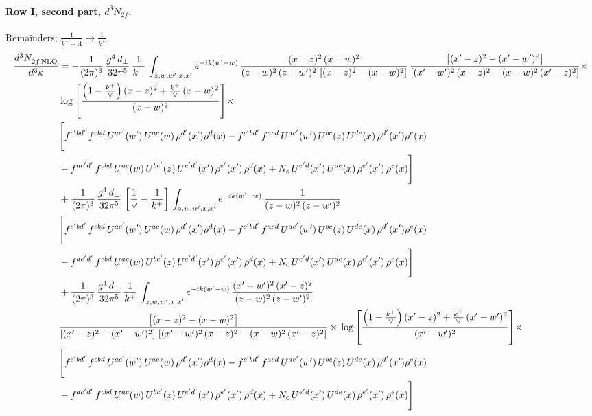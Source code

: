 \documentclass[10pt]{article}
\numberwithin{equation}{section}
\begin{document}
\paragraph{Row I, second part, $d^3N_{2f}$.}
Remainders; $\frac{1}{k^++\Lambda}\to\frac{1}{k^+}$.
\begin{align}
    \frac{d^{3}N_{2f\,\rm NLO}^{\rm}}{d^{3}k}  & =   - \frac{1}{(2\pi)^{3}}\, \frac{g^{4}\,d_{\perp}}{32\pi^{5}}\,\frac{1}{k^{+}}\,\int_{z,w,w^{\prime},x,x'} e^{-ik(w^{\prime}-w)}\,\frac{(x-z)^{2}\, (x-w)^{2}}{(z-w)^{2}\, (z-w')^{2}\,\left[(x-z)^{2} - (x-w)^{2}\right]}\,\frac{\left[(x'-z)^{2}-(x'-w')^{2}\right]}{\left[(x'-w')^{2}\, (x-z)^{2} - (x-w)^{2}\, (x'-z)^{2}\right]}\times\notag \\ & \log{\left[\frac{\left(1-\frac{k^{+}}{\vee}\right)(x-z)^{2}+\frac{k^{+}}{\vee}\,(x-w)^{2}}{(x-w)^{2}}\right]}\times\notag \\ & \Bigg[f^{c'bd'}\,f^{cbd}\, U^{ac'}(w')\,U^{ac}(w)\,\rho^{d'}(x')\rho^{d}(x)- f^{c'bd'}\,f^{acd}\,U^{ac'}(w')\,U^{bc}(z)\,U^{de}(x)\,\rho^{d'}(x')\rho^{e}(x) \notag \\ & -f^{ac'd'}\,f^{cbd}\,U^{ac}(w)\,U^{bc'}(z)\,U^{e'd'}(x')\,\rho^{e'}(x')\,\rho^{d}(x) +N_{c}\,U^{e'd}(x')\,U^{de}(x)\,\rho^{e'}(x')\,\rho^{e}(x)\Bigg]  \notag \\
& + \frac{1}{(2\pi)^{3}}\, \frac{g^{4}\,d_{\perp}}{32\pi^{5}}\,\left[\frac{1}{\vee} - \frac{1}{k^{+}}\right]\,\int_{z,w,w^{\prime},x,x'} e^{-ik(w^{\prime}-w)}\,\frac{1}{(z-w)^{2}\, (z-w')^{2}}\notag \\ & \Bigg[f^{c'bd'}\,f^{cbd}\, U^{ac'}(w')\,U^{ac}(w)\,\rho^{d'}(x')\rho^{d}(x)- f^{c'bd'}\,f^{acd}\,U^{ac'}(w')\,U^{bc}(z)\,U^{de}(x)\,\rho^{d'}(x')\rho^{e}(x) \notag \\ & -f^{ac'd'}\,f^{cbd}\,U^{ac}(w)\,U^{bc'}(z)\,U^{e'd'}(x')\,\rho^{e'}(x')\,\rho^{d}(x) +N_{c}\,U^{e'd}(x')\,U^{de}(x)\,\rho^{e'}(x')\,\rho^{e}(x)\Bigg]  \notag \\
& + \frac{1}{(2\pi)^{3}}\, \frac{g^{4}\,d_{\perp}}{32\pi^{5}}\,\frac{1}{k^{+}}\,\int_{z,w,w^{\prime},x,x'} e^{-ik(w^{\prime}-w)}\,\frac{(x'-w')^{2}\, (x'-z)^{2}}{(z-w)^{2}\, (z-w')^{2}}\notag \\ & \frac{\left[(x-z)^{2} - (x-w)^{2}\right]}{\left[(x'-z)^{2} - (x'-w')^{2}\right]\, \left[(x'-w')^{2}\, (x - z)^{2} - (x-w)^{2}\,(x'-z)^{2}\right]}\times\, \log{\left[\frac{\left(1-\frac{k^{+}}{\vee}\right)(x'-z)^{2}+\frac{k^{+}}{\vee}\,(x'-w')^{2}}{(x'-w')^{2}}\right]}\times \notag \\ &  \Bigg[f^{c'bd'}\,f^{cbd}\, U^{ac'}(w')\,U^{ac}(w)\,\rho^{d'}(x')\rho^{d}(x)- f^{c'bd'}\,f^{acd}\,U^{ac'}(w')\,U^{bc}(z)\,U^{de}(x)\,\rho^{d'}(x')\rho^{e}(x) \notag \\ & -f^{ac'd'}\,f^{cbd}\,U^{ac}(w)\,U^{bc'}(z)\,U^{e'd'}(x')\,\rho^{e'}(x')\,\rho^{d}(x) +N_{c}\,U^{e'd}(x')\,U^{de}(x)\,\rho^{e'}(x')\,\rho^{e}(x)\Bigg] \label{eq:R:G2I2f}
\end{align}
\end{document}
